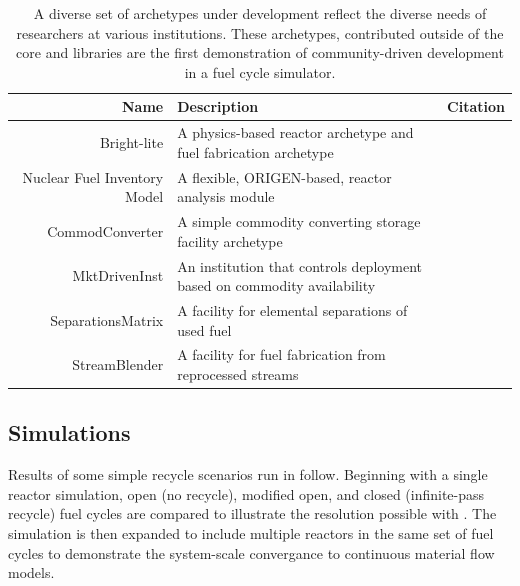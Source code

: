 \begin{table}[h]
\centering
\begin{tabularx}{\textwidth}{|r|X|r|}
\hline
\textbf{Name} & \textbf{Description} & \textbf{Citation} \\
\hline
Bright-lite & A physics-based reactor archetype and fuel fabrication archetype & \cite{flanagan_bright-lite_2014} \\
Nuclear Fuel Inventory Model & A flexible, ORIGEN-based, reactor analysis module & \cite{skutnik_nuclear_2014} \\
CommodConverter & A simple commodity converting storage facility archetype  & \cite{huff_commodconverter_2014} \\
MktDrivenInst & An institution that controls deployment based on commodity availability & \cite{huff_mktdriveninst_2014} \\
SeparationsMatrix & A facility for elemental separations of used fuel & \cite{huff_streamblender_2014} \\
StreamBlender & A facility for fuel fabrication from reprocessed streams & \cite{huff_streamblender_2014} \\
\hline
\end{tabularx}
\caption{A diverse set of archetypes under development reflect the diverse 
needs of researchers at various institutions. These archetypes, contributed 
outside of the \Cyclus core and \Cycamore libraries are the first demonstration 
of community-driven development in a fuel cycle simulator.}
\label{tab:archetypes}
\end{table}


\subsection{Simulations}


Results of some simple recycle scenarios run in \Cyclus follow. Beginning with a single
reactor simulation, open (no recycle), modified open, and closed (infinite-pass recycle) 
fuel cycles are compared to illustrate the resolution possible with \Cyclus.  The simulation
is then expanded to include multiple reactors in the same set of fuel cycles to demonstrate
the system-scale convergance to continuous material flow models. 

